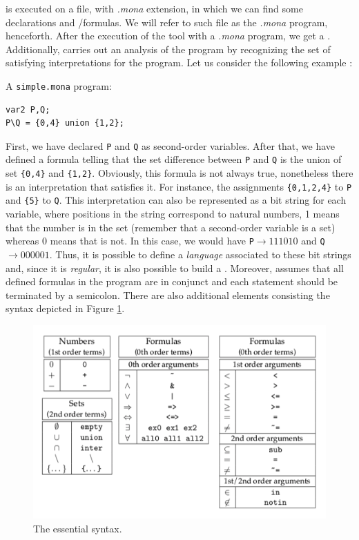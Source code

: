 \MONA is executed on a file, with \textit{.mona} extension, in which we can find some declarations and \wsos/\wsts formulas. We will refer to such file as the \textit{.mona} program, henceforth. After the execution of the tool with a \textit{.mona} program, we get a \DFA. Additionally, \MONA carries out an analysis of the program by recognizing the set of satisfying interpretations for the program. Let us consider the following example \citep{monamanual2001}:
\begin{example}
A \texttt{simple.mona} program:\\
\begin{lstlisting}[style=Mona, escapechar = £]
var2 P,Q;
P\Q = {0,4} union {1,2};
\end{lstlisting}
\end{example}
First, we have declared \texttt{P} and \texttt{Q} as second-order variables. After that, we have defined a formula telling that the set difference between \texttt{P} and \texttt{Q} is the union of set \texttt{\{0,4\}} and \texttt{\{1,2\}}. Obviously, this formula is not always true, nonetheless there is an interpretation that satisfies it. For instance, the assignments \texttt{\{0,1,2,4\}} to \texttt{P} and \texttt{\{5\}} to \texttt{Q}. This interpretation can also be represented as a bit string for each variable, where positions in the string correspond to natural numbers, 1 means that the number is in the set (remember that a second-order variable is a set) whereas 0 means that is not. In this case, we would have \texttt{P}$ \rightarrow 111010$ and \texttt{Q}$ \rightarrow 000001$. Thus, it is possible to define a \textit{language} associated to these bit strings and, since it is \textit{regular}, it is also possible to build a \DFA. Moreover, \MONA assumes that all defined formulas in the program are in conjunct and each statement should be terminated by a semicolon.
There are also additional elements consisting the \MONA syntax depicted in Figure \ref{fig:mona-syntax}.
\begin{figure}[h]
\centering
\includegraphics[width=\textwidth]{images/mona-syntax}
\caption{The essential \MONA syntax.}
\label{fig:mona-syntax}
\end{figure}
